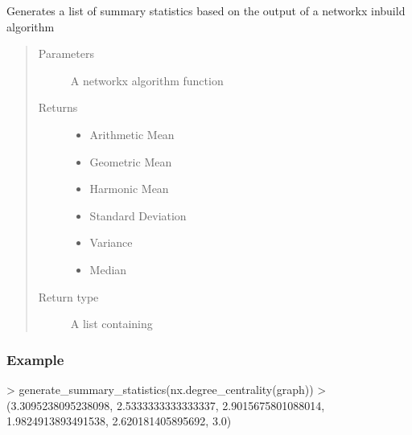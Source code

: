 \documentclass[letterpaper,10pt,english]{sphinxmanual}
\begin{document}

\begin{fulllineitems}
\label{\detokenize{source/yawning_titan.experiment_helpers:yawning_titan.experiment_helpers.graph_metrics.get_func_summary_statistics}}
\sphinxAtStartPar
Generates a list of summary statistics based on the
output of a networkx in\sphinxhyphen{}build algorithm
\begin{quote}\begin{description}
\item[{Parameters}] \leavevmode
\sphinxAtStartPar
{} \textendash{} A networkx algorithm function

\item[{Returns}] \leavevmode
\sphinxAtStartPar
\begin{itemize}
\item {}
\sphinxAtStartPar
Arithmetic Mean

\item {}
\sphinxAtStartPar
Geometric Mean

\item {}
\sphinxAtStartPar
Harmonic Mean

\item {}
\sphinxAtStartPar
Standard Deviation

\item {}
\sphinxAtStartPar
Variance

\item {}
\sphinxAtStartPar
Median

\end{itemize}


\item[{Return type}] \leavevmode
\sphinxAtStartPar
A list containing

\end{description}\end{quote}
\subsubsection*{Example}

\sphinxAtStartPar
\textgreater{} generate\_summary\_statistics(nx.degree\_centrality(graph))
\textgreater{} (3.3095238095238098, 2.5333333333333337, 2.9015675801088014, 1.9824913893491538, 2.620181405895692, 3.0)

\end{fulllineitems}
\end{document}
